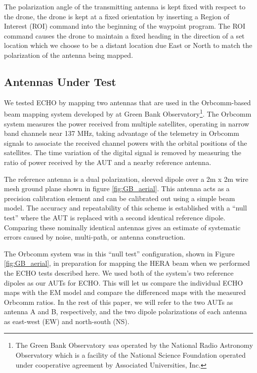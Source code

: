 \documentclass[preprint2,numberedappendix,tighten,twocolappendix]{aastex6}
\begin{document}
The polarization angle of the transmitting antenna is kept fixed with respect to the drone, the drone is kept at a fixed orientation by inserting a Region of Interest (ROI) command into the beginning of the waypoint program.  The ROI command causes the drone to maintain a fixed heading in the direction of a set location which we choose to be a distant location due East or North to match the polarization of the antenna being mapped.


\subsection{Antennas Under Test}

We tested ECHO by mapping two antennas that are used in the Orbcomm-based beam mapping system developed by \citet{2015RaSc...50..614N,2016:NebenHERAdish} at Green Bank Observatory\footnote{The Green Bank Observatory \emph{was} operated by the National Radio Astronomy Observatory which is a facility of the National Science Foundation operated under cooperative agreement by Associated Universities, Inc.}.  The Orbcomm system measures the power received from multiple satellites, operating in narrow band channels near 137 MHz, taking advantage of the telemetry in Orbcomm signals to associate the received channel powers with the orbital positions of the satellites.   The time variation of the digital signal is removed by measuring the ratio of power received by the AUT and a nearby reference antenna.


The reference antenna is a dual polarization, sleeved  dipole over a 2m x 2m wire mesh ground plane shown in figure \ref{fig:GB_aerial}.  This antenna acts as a precision calibration element and can be calibrated out using a simple beam model.  The accuracy and repeatability of this scheme is established with a ``null test'' where the AUT is replaced with a second identical reference dipole.  Comparing these nominally identical antennas gives an estimate of systematic errors caused by noise, multi-path, or antenna construction.

The Orbcomm system was in this ``null test'' configuration, shown in Figure \ref{fig:GB_aerial}, in preparation for mapping the HERA beam \citep{2016:NebenHERAdish} when we performed the ECHO tests described here.   We used both of the system's two reference dipoles as our AUTs for ECHO. This will let us compare the individual ECHO maps with the EM model and compare the differenced maps with the measured Orbcomm ratios.  In the rest of this paper, we will refer to the two AUTs as antenna A and B, respectively, and the two dipole polarizations of each antenna as east-west (EW) and north-south (NS).
\end{document}
